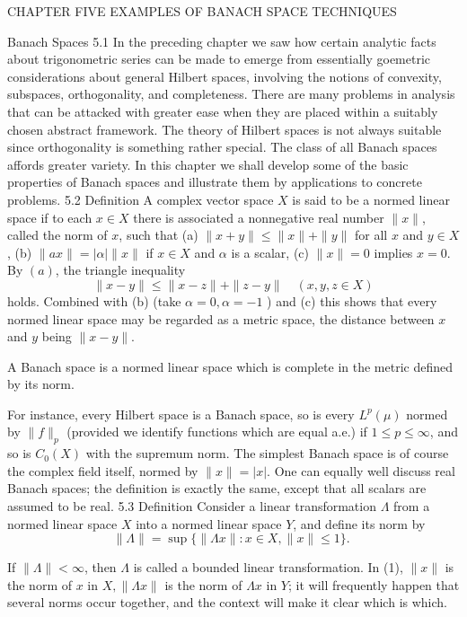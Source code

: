 CHAPTER FIVE
EXAMPLES OF BANACH SPACE TECHNIQUES

Banach Spaces
5.1 In the preceding chapter we saw how certain analytic facts about trigonometric series can be made to emerge from essentially goemetric considerations about general Hilbert spaces, involving the notions of convexity, subspaces, orthogonality, and completeness. There are many problems in analysis that can be attacked with greater ease when they are placed within a suitably chosen abstract framework. The theory of Hilbert spaces is not always suitable since orthogonality is something rather special. The class of all Banach spaces affords greater variety. In this chapter we shall develop some of the basic properties of Banach spaces and illustrate them by applications to concrete problems.
5.2 Definition A complex vector space $X$ is said to be a normed linear space if to each $x \in X$ there is associated a nonnegative real number $\|x\|$, called the norm of $x$, such that
(a) $\|x+y\| \leq\|x\|+\|y\|$ for all $x$ and $y \in X$,
(b) $\|a x\|=|\alpha|\|x\|$ if $x \in X$ and $\alpha$ is a scalar,
(c) $\|x\|=0$ implies $x=0$.
By $(a)$, the triangle inequality
$$
\|x-y\| \leq\|x-z\|+\|z-y\| \quad(x, y, z \in X)
$$
holds. Combined with (b) (take $\alpha=0, \alpha=-1$ ) and (c) this shows that every normed linear space may be regarded as a metric space, the distance between $x$ and $y$ being $\|x-y\|$.

A Banach space is a normed linear space which is complete in the metric defined by its norm.

For instance, every Hilbert space is a Banach space, so is every $L^p(\mu)$ normed by $\|f\|_p$ (provided we identify functions which are equal a.e.) if $1 \leq p \leq \infty$, and so is $C_0(X)$ with the supremum norm. The simplest Banach space is of course the complex field itself, normed by $\|x\|=|x|$.
One can equally well discuss real Banach spaces; the definition is exactly the same, except that all scalars are assumed to be real.
5.3 Definition Consider a linear transformation $\Lambda$ from a normed linear space $X$ into a normed linear space $Y$, and define its norm by
$$
\|\Lambda\|=\sup \{\|\Lambda x\|: x \in X,\|x\| \leq 1\} \text {. }
$$

If $\|\Lambda\|<\infty$, then $\Lambda$ is called a bounded linear transformation.
In (1), $\|x\|$ is the norm of $x$ in $X,\|\Lambda x\|$ is the norm of $\Lambda x$ in $Y$; it will frequently happen that several norms occur together, and the context will make it clear which is which.


